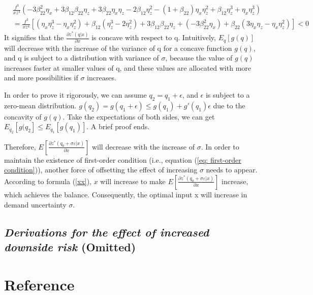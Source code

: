 \documentclass{article}
\begin{document}
\begin{equation*}
\begin{aligned}
&\frac{f^{3}}{xz^{4}}\left(-3\beta_{22}^{2}\eta_{x}+3\beta_{12}\beta_{22}\eta_{z}+3\beta_{22}\eta_{x}\eta_{z}-2\beta_{12}\eta_{z}^{2}-(1 + \beta_{22})\eta_{x}\eta_{z}^{2}+\beta_{12}\eta_{z}^{3}+\eta_{x}\eta_{z}^{3}\right) \\
&=\frac{f^{3}}{xz^{4}}\left[(\eta_x\eta_z^3-\eta_x\eta_z^2)+\beta_{12}(\eta_z^3 - 2\eta_z^2)+3\beta_{12}\beta_{22}\eta_{z}+(-3\beta_{22}^2\eta_x) + \beta_{22}(3\eta_x\eta_z-\eta_x\eta_z^2)\right]<0
\end{aligned}
\end{equation*}
It signifies that the $\frac{\partial z^*(q|x)}{\partial x}$ is concave with respect to q. Intuitively, $E_{q}[g(q)]$ will decrease with the increase of the variance of q for a concave function $g(q)$, and q is subject to a distribution with variance of $\sigma$, because the value of $g(q)$ increases faster at smaller values of q, and these values are allocated with more and more possibilities if $\sigma$ increases.\par
In order to prove it rigorously, we can assume $q_{2} = q_{1}+\epsilon$, and $\epsilon$ is subject to a zero-mean distribution. $g(q_{2})=g(q_{1}+\epsilon)\leq g(q_{1})+g'(q_{1})\epsilon$ due to the concavity of $g(q)$. Take the expectations of both sides, we can get $E_{q_{2}}[g(q_{2}]\leq E_{q_{1}}[g(q_{1})]$. A brief proof ends.\par
Therefore, $E\left[\frac{\partial z^*(q_0+\sigma\varepsilon|x)}{\partial x}\right]$ will decrease with the increase of $\sigma$. In order to maintain the existence of first-order condition (i.e., equation (\ref{eq: first-order condition})), another force of offsetting the effect of increasing $\sigma$ needs to appear. According to formula (\ref{xx}), $x$ will increase to make $E\left[\frac{\partial z^*(q_0+\sigma\varepsilon|x)}{\partial x}\right]$ increase, which achieves the balance. Consequently, the optimal input x will increase in demand uncertainty $\sigma$.

\subsection*{\textit{Derivations for the effect of increased downside risk} (Omitted)}
\newpage
\section*{Reference}

\end{document}
